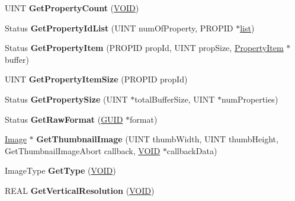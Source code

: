 \begin{DoxyCompactItemize}
\mbox{\label{class_image_a505476d97680d8b65d0b3ccd1260f030}} 
U\+I\+NT {\bfseries Get\+Property\+Count} (\hyperlink{interfacevoid}{V\+O\+ID})
\item 
\mbox{\label{class_image_a8760dc7a6e2c4f68076688ca68575a93}} 
Status {\bfseries Get\+Property\+Id\+List} (U\+I\+NT num\+Of\+Property, P\+R\+O\+P\+ID $\ast$\hyperlink{classlist}{list})
\item 
\mbox{\label{class_image_a67d33d60065476e054cf61aac64f785f}} 
Status {\bfseries Get\+Property\+Item} (P\+R\+O\+P\+ID prop\+Id, U\+I\+NT prop\+Size, \hyperlink{struct_property_item}{Property\+Item} $\ast$buffer)
\item 
\mbox{\label{class_image_a7fc6598c469e0e49daa925409ed208c6}} 
U\+I\+NT {\bfseries Get\+Property\+Item\+Size} (P\+R\+O\+P\+ID prop\+Id)
\item 
\mbox{\label{class_image_a019399fd00ab8c6d453d0e34dd0cb809}} 
Status {\bfseries Get\+Property\+Size} (U\+I\+NT $\ast$total\+Buffer\+Size, U\+I\+NT $\ast$num\+Properties)
\item 
\mbox{\label{class_image_a999eb5bad088e65f2d0ffacb67b00af8}} 
Status {\bfseries Get\+Raw\+Format} (\hyperlink{interface_g_u_i_d}{G\+U\+ID} $\ast$format)
\item 
\mbox{\label{class_image_ae88cf432218f78730f3ca9906109588f}} 
\hyperlink{class_image}{Image} $\ast$ {\bfseries Get\+Thumbnail\+Image} (U\+I\+NT thumb\+Width, U\+I\+NT thumb\+Height, Get\+Thumbnail\+Image\+Abort callback, \hyperlink{interfacevoid}{V\+O\+ID} $\ast$callback\+Data)
\item 
\mbox{\label{class_image_aa1e88148b9536362ca986959c59a3733}} 
Image\+Type {\bfseries Get\+Type} (\hyperlink{interfacevoid}{V\+O\+ID})
\item 
\mbox{\label{class_image_a3e98d9208ceccecdd1bf3bef3051c591}} 
R\+E\+AL {\bfseries Get\+Vertical\+Resolution} (\hyperlink{interfacevoid}{V\+O\+ID})
\item 
\mbox{\label{class_image_ae543c846124c21495df2e87dfc6286c7}} 

\end{DoxyCompactItemize}
